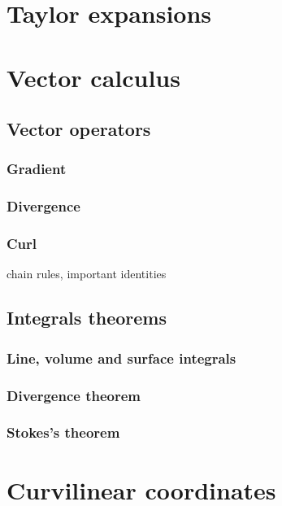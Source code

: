 \documentclass{article}
\begin{document}
\section{Taylor expansions}

\newpage

\section{Vector calculus}

\subsection{Vector operators}

\subsubsection{Gradient}

\subsubsection{Divergence}

\subsubsection{Curl}

chain rules, important identities

\subsection{Integrals theorems}

\subsubsection{Line, volume and surface integrals}

\subsubsection{Divergence theorem}

\subsubsection{Stokes's theorem}

\newpage

\section{Curvilinear coordinates}
\end{document}
